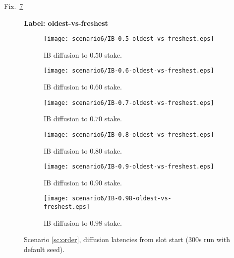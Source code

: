 \documentclass[11pt,a4paper]{article}
\newcommand{\debug}[1]{#1}
\begin{document}
Fix.~\ref{fig:oldest-vs-freshest}
\begin{figure}[htbp]
    \centering
    \debug{\textbf{Label: oldest-vs-freshest} \\}
    \begin{subfigure}[b]{0.45\textwidth}
        \centering
        \texttt{[image: scenario6/IB-0.5-oldest-vs-freshest.eps]}
        \caption{IB diffusion to $0.50$ stake.}
        \label{fig:oldest-vs-freshest:ib0.5}
    \end{subfigure}
    \hfill
    \begin{subfigure}[b]{0.45\textwidth}
        \centering
        \texttt{[image: scenario6/IB-0.6-oldest-vs-freshest.eps]}
        \caption{IB diffusion to $0.60$ stake.}
        \label{fig:oldest-vs-freshest:ib0.6}
    \end{subfigure}
    
    \vspace{1em}
    
    \begin{subfigure}[b]{0.45\textwidth}
        \centering
        \texttt{[image: scenario6/IB-0.7-oldest-vs-freshest.eps]}
        \caption{IB diffusion to $0.70$ stake.}
        \label{fig:oldest-vs-freshest:ib0.7}
    \end{subfigure}
    \hfill
    \begin{subfigure}[b]{0.45\textwidth}
        \centering
        \texttt{[image: scenario6/IB-0.8-oldest-vs-freshest.eps]}
        \caption{IB diffusion to $0.80$ stake.}
        \label{fig:oldest-vs-freshest:ib0.8}
    \end{subfigure}
    
    \vspace{1em}
    
    \begin{subfigure}[b]{0.45\textwidth}
        \centering
        \texttt{[image: scenario6/IB-0.9-oldest-vs-freshest.eps]}
        \caption{IB diffusion to $0.90$ stake.}
        \label{fig:oldest-vs-freshest:ib0.9}
    \end{subfigure}
    \hfill
    \begin{subfigure}[b]{0.45\textwidth}
        \centering
        \texttt{[image: scenario6/IB-0.98-oldest-vs-freshest.eps]}
        \caption{IB diffusion to $0.98$ stake.}
        \label{fig:oldest-vs-freshest:ib0.98}
    \end{subfigure}

    \caption{Scenario \ref{sc:order}, diffusion latencies from slot start (300s run with default seed).}
    \label{fig:oldest-vs-freshest}
\end{figure}




\end{document}
